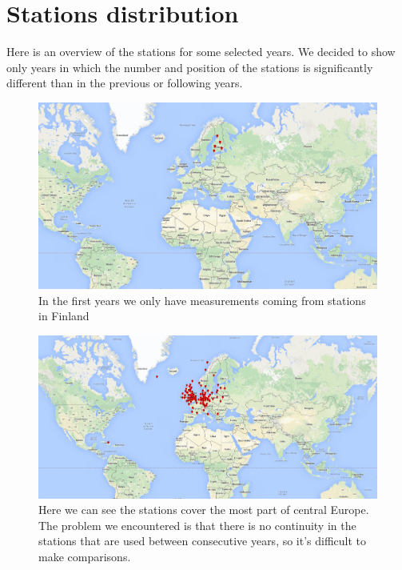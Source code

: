 \documentclass{vldb}
\begin{document}
\newpage
\appendix
\section{Stations distribution} \label{App:AppendixA}
Here is an overview of the stations for some selected years. We decided to show only years in which the number and position of the stations is significantly different than in the previous or following years.

\begin{figure}[tbh]
\includegraphics[width=1\linewidth]{stations1907}
\caption{In the first years we only have measurements coming from stations in Finland}
\label{fig:stations1907}
\end{figure}
\begin{figure}[tbh]
\includegraphics[width=1\linewidth]{stations1930}
\caption{Here we can see the stations cover the most part of central Europe. The problem we encountered is that there is no continuity in the stations that are used between consecutive years, so it's difficult to make comparisons.}
\label{fig:stations1930}
\end{figure}
\end{document}
